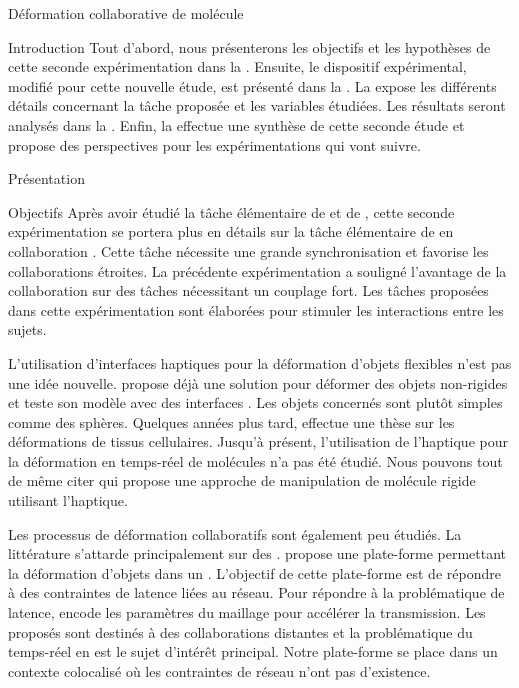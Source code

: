 \documentclass[myfrancais]{mythesis}
\begin{document}
\begin{mychapter}{Déformation collaborative de molécule}
\begin{mysection}{Introduction}
			Tout d'abord, nous présenterons les objectifs et les hypothèses de cette seconde expérimentation dans la .
			Ensuite, le dispositif expérimental, modifié pour cette nouvelle étude, est présenté dans la .
			La  expose les différents détails concernant la tâche proposée et les variables étudiées.
			Les résultats seront analysés dans la .
			Enfin, la  effectue une synthèse de cette seconde étude et propose des perspectives pour les expérimentations qui vont suivre.
		\end{mysection}
		\begin{mysection}{Présentation}
			\begin{mysubsection}{Objectifs}
				Après avoir étudié la tâche élémentaire de  et de , cette seconde expérimentation se portera plus en détails sur la tâche élémentaire de  en collaboration .
				Cette tâche nécessite une grande synchronisation et favorise les collaborations étroites.
				La précédente expérimentation  a souligné l'avantage de la collaboration sur des tâches nécessitant un couplage fort.
				Les tâches proposées dans cette expérimentation sont élaborées pour stimuler les interactions entre les sujets.

				L'utilisation d'interfaces haptiques pour la déformation d'objets flexibles n'est pas une idée nouvelle.
				 propose déjà une solution pour déformer des objets non-rigides et teste son modèle avec des interfaces \myOmni.
				Les objets concernés sont plutôt simples comme des sphères.
				Quelques années plus tard,  effectue une thèse sur les déformations de tissus cellulaires.
				Jusqu'à présent, l'utilisation de l'haptique pour la déformation en temps-réel de molécules n'a pas été étudié.
				Nous pouvons tout de même citer  qui propose une approche de manipulation de molécule rigide utilisant l'haptique.

				Les processus de déformation collaboratifs sont également peu étudiés.
				La littérature s'attarde principalement sur des .
				 propose une plate-forme permettant la déformation d'objets dans un .
				L'objectif de cette plate-forme est de répondre à des contraintes de latence liées au réseau.
				Pour répondre à la problématique de latence,  encode les paramètres du maillage pour accélérer la transmission.
				Les  proposés sont destinés à des collaborations distantes et la problématique du temps-réel en est le sujet d'intérêt principal.
				Notre plate-forme se place dans un contexte colocalisé où les contraintes de réseau n'ont pas d'existence.


\end{mysubsection}
\end{mysection}
\end{mychapter}
\end{document}
